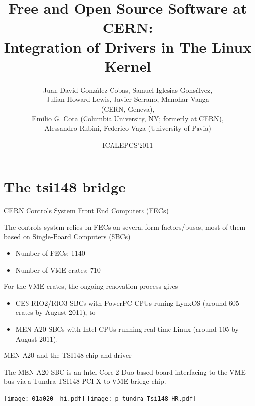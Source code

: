 \documentclass{beamer}
\title[FOSS at CERN: Drivers in the Kernel]%
	{Free and Open Source Software at CERN:\\
	Integration of Drivers in The Linux Kernel}
\author[David Cobas et al.]{%
	Juan David Gonz\'alez Cobas, Samuel Iglesias Gons\'alvez,\\
	Julian Howard Lewis, Javier Serrano, Manohar Vanga\\
		(CERN, Geneva),\\
	Emilio G. Cota (Columbia University, NY; formerly at CERN),\\
	Alessandro Rubini, Federico Vaga (University of Pavia)}
\date{ICALEPCS'2011}
\begin{document}
\begin{frame}
\titlepage
\end{frame}

\begin{frame}
\tableofcontents
\end{frame}

\section{The tsi148 bridge}
\begin{frame}{CERN Controls System Front End Computers (FECs)}

The controls system relies on FECs on several form factors/buses,
most of them based on Single-Board Computers (SBCs)

\begin{itemize}
\item Number of FECs: 1140
\item Number of VME crates: 710
\end{itemize}

For the VME crates, the ongoing renovation process gives
\begin{itemize}
\item CES RIO2/RIO3 SBCs with PowerPC CPUs runing
LynxOS (around 605 crates by August 2011), to
\item MEN-A20 SBCs with Intel CPUs running real-time
Linux (around 105 by August 2011).
\end{itemize}
\end{frame}


\begin{frame}{MEN A20 and the TSI148 chip and driver}

The MEN A20 SBC is an Intel Core 2 Duo-based board interfacing to the
VME bus via a Tundra TSI148 PCI-X to VME bridge chip.

\begin{center}
\texttt{[image: 01a020-\_hi.pdf]} \qquad
\texttt{[image: p\_tundra\_Tsi148-HR.pdf]}
\end{center}
\end{frame}
\end{document}
